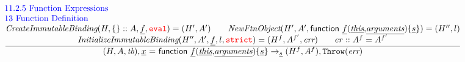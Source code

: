 \documentclass[a4paper, leqno]{amsart}
\newcommand{\rulesep}{\quad\quad}
\newcommand{\stmt}{s}
\newcommand{\expr}{e}
\newcommand{\ir}[1]{\ensuremath{\underline{#1}}}
\newcommand{\irid}{\ir{x}}
\def\inred{\color{red}}
\def\inblue{\color{blue}}
\newcommand{\strict}{{\inred\tt strict}}
\newcommand{\eval}{{\inred\tt eval}}
\newcommand{\tb}{\emph{tb}}
\newcommand{\err}{\emph{err}}
\newcommand{\hf}[1]{\emph{#1}}
\newcommand{\error}{\ensuremath{{\tt Throw}(\err)}}
\newcommand{\state}{\ensuremath{(H,A,\tb)}}
\newcommand{\res}{\ensuremath{(H,A)}}
\newcommand{\resp}{\ensuremath{(H',A')}}
\newcommand{\evale}{\ensuremath{(H,A,\tb)}}
\newcommand{\irnew}{\ensuremath{\irid \ {\tt =} \ {\sf new} \ \ir\expr}}
\newcommand{\irfv}{\ensuremath{{\sf function} \ \ir{f} {\tt(}\ir{\emph{this}}{\tt,}\ir{\emph{arguments}}{\tt) \{} \ir\stmt {\tt\}}}}
\newcommand{\irfunexpr}{\ensuremath{\irid \ {\tt =} \ \irfv}}
\def\inred{\color{red}}
\def\inblue{\color{blue}}
\begin{document}
\[
\begin{array}{l@{~~}l@{~~}ll}





\mbox{\inblue 11.2.5 Function Expressions}\\
\mbox{\inblue 13 Function Definition}\\
\frac{\begin{matrix}
\hf{CreateImmutableBinding}(H, \{\}::A, \ir{f}, \eval) = \resp
\rulesep
\hf{NewFtnObject}(H',A',\irfv) = (H'', l)
\\
\hf{InitializeImmutableBinding}(H'', A', \ir{f}, l, \strict) =   (H^f, A^{f'}, \err)%
\rulesep
er::A^f = A^{f'}
\end{matrix}}{\begin{matrix}
\state, \irfunexpr \rightarrow_{\ir\stmt} (H^f,A^f), \error
\end{matrix}}\\\\


\end{array}\]
\end{document}
